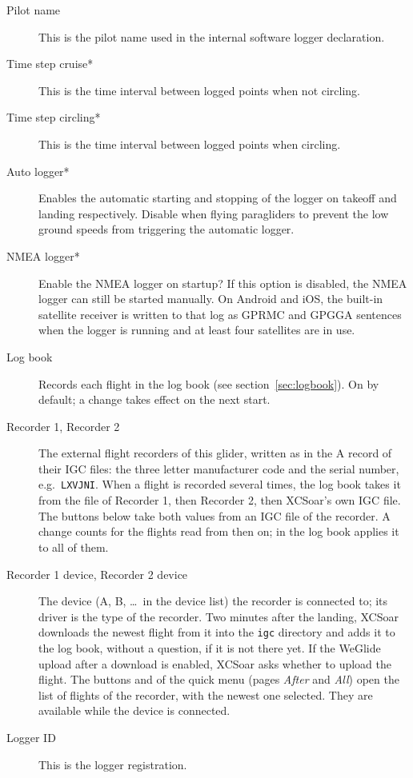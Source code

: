 \begin{description}
\item[Pilot name]  This is the pilot name used in the internal software logger 
  declaration.
\item[Time step cruise*]  This is the time interval between logged points when 
  not circling. 
\item[Time step circling*]  This is the time interval between logged points when 
  circling. 
\item[Auto logger*]  Enables the automatic starting and stopping of the logger
  on takeoff and landing respectively. Disable when flying paragliders to prevent 
  the low ground speeds from triggering the automatic logger.
\item[NMEA logger*]  Enable the NMEA logger on startup? If this option is disabled, 
  the NMEA logger can still be started manually.  On Android and iOS,
  the built-in satellite receiver is written to that log as GPRMC and
  GPGGA sentences when the logger is running and at least four
  satellites are in use.
\item[Log book]  Records each flight in the log book (see
  section~\ref{sec:logbook}).  On by default; a change takes effect on
  the next start.
\item[Recorder 1, Recorder 2]  The external flight recorders of this
  glider, written as in the A record of their IGC files: the three
  letter manufacturer code and the serial number, e.g.\ \verb|LXVJNI|.
  When a flight is recorded several times, the log book takes it from
  the file of Recorder 1, then Recorder 2, then XCSoar's own IGC file.
  The buttons below take both values from an IGC file of the recorder.
  A change counts for the flights read from then on; 
  in the log book applies it to all of them.
\item[Recorder 1 device, Recorder 2 device]  The device (A, B, \ldots\ in the device
  list) the recorder is connected to;
  its driver is the type of the recorder.  Two minutes after the
  landing, XCSoar downloads the newest flight from it into the
  \texttt{igc} directory and adds it to the log book, without a
  question, if it is not there yet.  If the WeGlide upload after a
  download is enabled, XCSoar asks whether to upload the flight.  The
  buttons  and 
  of the quick menu (pages \emph{After} and \emph{All}) open the list
  of flights of the recorder, with the newest one selected.  They are
  available while the device is connected.
\item[Logger ID]  This is the logger registration.
\end{description}


